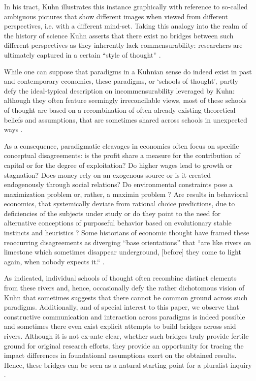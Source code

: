 \documentclass{article}
\begin{document}
In his tract, Kuhn illustrates this instance graphically with reference to so-called ambiguous pictures that show different images when viewed from different perspectives, i.e. with a different mind-set. Taking this analogy into the realm of the history of science Kuhn asserts that there exist no bridges between such different perspectives as they inherently lack commensurability: researchers are ultimately captured in a certain “style of thought” \citep{Fleck1935}.

While one can suppose that paradigms in a Kuhnian sense do indeed exist in past and contemporary economics, these paradigms, or ‘schools of thought’, partly defy the ideal-typical description on incommensurability leveraged by Kuhn: although they often feature seemingly irreconcilable views, most of these schools of thought are based on a recombination of often already existing theoretical beliefs and assumptions, that are sometimes shared across schools in unexpected ways \citep[e.g.][]{Kaldor1961,Lawson1985}.

As a consequence, paradigmatic cleavages in economics often focus on specific conceptual disagreements: is the profit share a measure for the contribution of capital or for the degree of exploitation? Do higher wages lead to growth or stagnation? Does money rely on an exogenous source or is it created endogenously through social relations? Do environmental constraints pose a maximization problem or, rather, a maximin problem \citep{Costanza.1989}? Are results in behavioral economics, that systemically deviate from rational choice predictions, due to deficiencies of the subjects under study \citep{Gintis.2010} or do they point to the need for alternative conceptions of purposeful behavior based on evolutionary stable instincts and heuristics \citep{gigerenzer1999simple}? Some historians of economic thought have framed these reoccurring disagreements as diverging “base orientations” that “are like rivers on limestone which sometimes disappear underground, [before] they come to light again, when nobody expects it.“ \citep[][p. 9]{Screpanti2005}.

As indicated, individual schools of thought often recombine distinct elements from these rivers and, hence, occasionally defy the rather dichotomous vision of Kuhn that sometimes suggests that there cannot be common ground across such paradigms. Additionally, and of special interest to this paper, we observe that constructive communication and interaction across paradigms is indeed possible and sometimes there even exist explicit attempts to build bridges across said rivers. Although it is not ex-ante clear, whether such bridges truly provide fertile ground for original research efforts, they provide an opportunity for tracing the impact differences in foundational assumptions exert on the obtained results. Hence, these bridges can be seen as a natural starting point for a pluralist inquiry \citep[see also][]{Dobusch.2012}.
\end{document}
